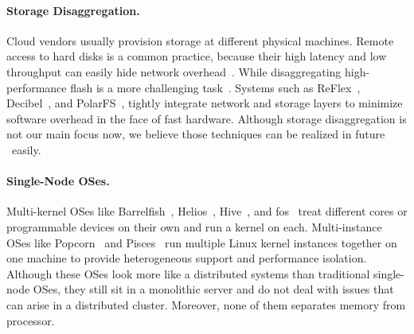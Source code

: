 \documentclass[10pt,times,twocolumn]{z2-article}
\begin{document}
{{{{{{{\paragraph{Storage Disaggregation.}
Cloud vendors usually provision storage at different physical machines\cite{deepview-nsdi18,url:aws-storage,url:vmware-vSAN}.
Remote access to hard disks is a common practice, because their high latency and low throughput
can easily hide network overhead~\cite{petal-asplos96,blizzard-nsdi14,Parallax-hotos15,Legtchenko-hotstorage17}.
While disaggregating high-performance flash is a more challenging task~\cite{FlashDisaggregation,url:facebook-lighting}.
Systems such as ReFlex~\cite{ReFlex}, Decibel~\cite{decibel-nsdi17}, and PolarFS~\cite{PolarFS-VLDB18},
tightly integrate network and storage layers to minimize software overhead in the face of fast hardware.
Although storage disaggregation is not our main focus now,
we believe those techniques can be realized in future \lego\ easily.



\paragraph{Single-Node OSes.}
Multi-kernel OSes like Barrelfish~\cite{Baumann-SOSP09,Barrelfish-DC}, Helios~\cite{Helios-SOSP}, Hive~\cite{Hive-SOSP}, and fos~\cite{fos-SOCC}
treat different cores or programmable devices on their own and run a kernel on each.
Multi-instance OSes like Popcorn~\cite{popcorn-eurosys15} and Pisces~\cite{Pisces-hpdc15} run multiple Linux kernel instances
together on one machine to provide heterogeneous support and performance isolation.
Although these OSes look more like a distributed systems than traditional single-node OSes,
they still sit in a monolithic server and do not deal with issues that can arise in a distributed cluster.
Moreover, none of them separates memory from processor. 


}}}}}}}
\end{document}
